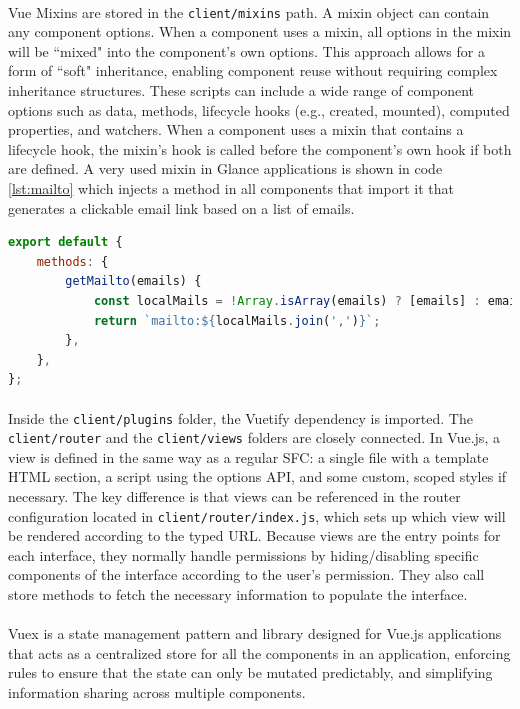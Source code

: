 \paragraph{} Vue Mixins are stored in the \verb|client/mixins| path. A mixin object can contain any component options. When a component uses a mixin, all options in the mixin will be ``mixed" into the component's own options. This approach allows for a form of ``soft" inheritance, enabling component reuse without requiring complex inheritance structures. These scripts can include a wide range of component options such as data, methods, lifecycle hooks (e.g., created, mounted), computed properties, and watchers. When a component uses a mixin that contains a lifecycle hook, the mixin's hook is called before the component's own hook if both are defined. A very used mixin in Glance applications is shown in code \ref{lst:mailto} which injects a method in all components that import it that generates a clickable email link based on a list of emails.

\begin{lstlisting}[language=javascript, caption={Mailto Mixin.}, label=lst:mailto]
export default {
    methods: {
        getMailto(emails) {
            const localMails = !Array.isArray(emails) ? [emails] : emails;
            return `mailto:${localMails.join(',')}`;
        },
    },
};
\end{lstlisting}

\paragraph{} Inside the \verb|client/plugins| folder, the Vuetify dependency is imported. The \verb|client/router| and the \verb|client/views| folders are closely connected. In Vue.js, a view is defined in the same way as a regular SFC: a single file with a template HTML section, a script using the options API, and some custom, scoped styles if necessary. The key difference is that views can be referenced in the router configuration located in \verb|client/router/index.js|, which sets up which view will be rendered according to the typed URL. Because views are the entry points for each interface, they normally handle permissions by hiding/disabling specific components of the interface according to the user's permission. They also call store methods to fetch the necessary information to populate the interface.

\paragraph{} Vuex is a state management pattern and library designed for Vue.js applications that acts as a centralized store for all the components in an application, enforcing rules to ensure that the state can only be mutated predictably, and simplifying information sharing across multiple components.

